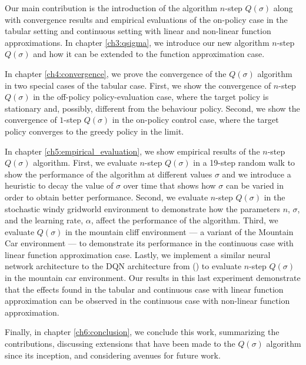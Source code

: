 Our main contribution is the introduction of the algorithm $n$-step $Q(\sigma)$ along with convergence results and empirical evaluations of the on-policy case in the tabular setting and continuous setting with linear and non-linear function approximations.
In chapter \ref{ch3:qsigma}, we introduce our new algorithm $n$-step $Q(\sigma)$ and how it can be extended to the function approximation case.

In chapter \ref{ch4:convergence}, we prove the convergence of the $Q(\sigma)$ algorithm in two special cases of the tabular case.
First, we show the convergence of $n$-step $Q(\sigma)$ in the off-policy policy-evaluation case, where the target policy is stationary and, possibly, different from the behaviour policy.
Second, we show the convergence of $1$-step $Q(\sigma)$ in the on-policy control case, where the target policy converges to the greedy policy in the limit. 

In chapter \ref{ch5:empirical_evaluation}, we show empirical results of the $n$-step $Q(\sigma)$ algorithm. 
First, we evaluate $n$-step $Q(\sigma)$ in a 19-step random walk to show the performance of the algorithm at different values $\sigma$ and we introduce a heuristic to decay the value of $\sigma$ over time that shows how $\sigma$ can be varied in order to obtain better performance.
Second, we evaluate $n$-step $Q(\sigma)$ in the stochastic windy gridworld environment to demonstrate how the parameters $n$, $\sigma$, and the learning rate, $\alpha$, affect the performance of the algorithm.
Third, we evaluate $Q(\sigma)$ in the mountain cliff environment --- a variant of the Mountain Car environment --- to demonstrate its performance in the continuous case with linear function approximation case.
Lastly, we implement a similar neural network architecture to the DQN architecture from \citeauthor{mnih2015humanlevel} (\citeyear{mnih2015humanlevel}) to evaluate $n$-step $Q(\sigma)$ in the mountain car environment. 
Our results in this last experiment demonstrate that the effects found in the tabular and continuous case with linear function approximation can be observed in the continuous case with non-linear function approximation. 

Finally, in chapter \ref{ch6:conclusion}, we conclude this work, summarizing the contributions, discussing extensions that have been made to the $Q(\sigma)$ algorithm since its inception, and considering avenues for future work.
